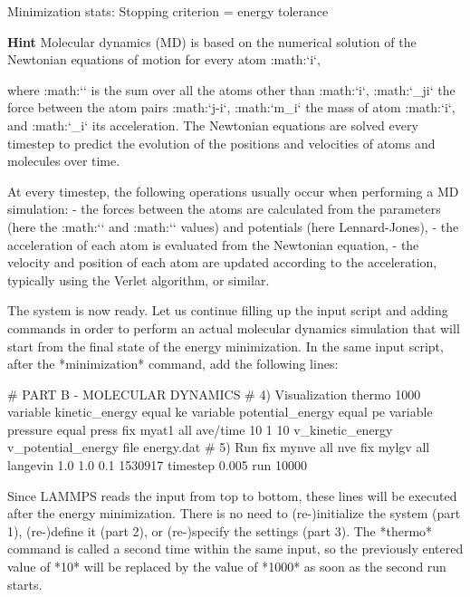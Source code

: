 \begin{lcverbatim}
Minimization stats:
Stopping criterion = energy tolerance
\end{lcverbatim}





\textbf{Hint} Molecular dynamics (MD) is based on the numerical solution of the Newtonian
equations of motion for every atom :math:`i`,


where :math:`\sum` is the sum over all the atoms other than :math:`i`, 
:math:`_{ji}` the force between the atom pairs :math:`j-i`,
:math:`m_i` the mass of atom :math:`i`, and :math:`_i` its acceleration. 
The Newtonian equations are solved every timestep to predict the
evolution of the positions and velocities of atoms and molecules over time. 

At every timestep, the following operations usually occur when 
performing a MD simulation:
- the forces between the atoms are calculated from the parameters (here the :math:`\epsilon` and :math:`\sigma` values) and potentials (here Lennard-Jones),
- the acceleration of each atom is evaluated from the Newtonian equation,
- the velocity and position of each atom are updated according to the acceleration, typically using the Verlet algorithm, or similar.


The system is now ready. Let us continue filling up the
input script and adding commands in order to perform an actual molecular dynamics
simulation that will start from the final state of the energy minimization.
In the same input script, after the *minimization* command, add the following
lines:



\begin{lcverbatim}
# PART B - MOLECULAR DYNAMICS
# 4) Visualization
thermo 1000
variable kinetic_energy equal ke
variable potential_energy equal pe
variable pressure equal press
fix myat1 all ave/time 10 1 10 v_kinetic_energy v_potential_energy file energy.dat
# 5) Run
fix mynve all nve
fix mylgv all langevin 1.0 1.0 0.1 1530917
timestep 0.005
run 10000
\end{lcverbatim}

Since LAMMPS reads the input from top to
bottom, these lines will be executed after the energy
minimization. There is no need to (re-)initialize the system
(part 1), (re-)define it (part 2), or (re-)specify the settings
(part 3). The *thermo* command is called a second time within the 
same input, so the previously entered value of *10* will be replaced
by the value of *1000* as soon as the second run starts.


